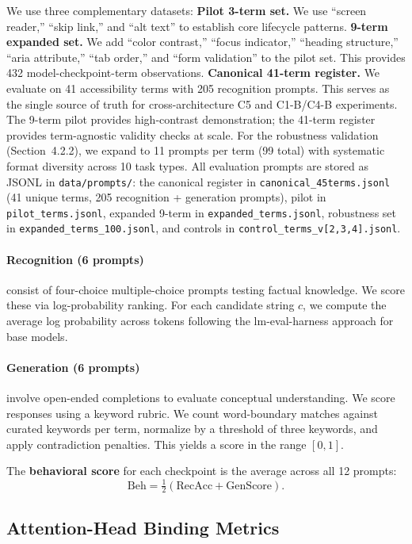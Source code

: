 \documentclass[10pt]{article} %
\begin{document}
We use three complementary datasets:
\textbf{Pilot 3-term set.} We use ``screen reader,'' ``skip link,'' and ``alt text'' to establish core lifecycle patterns.
\textbf{9-term expanded set.} We add ``color contrast,'' ``focus indicator,'' ``heading structure,'' ``aria attribute,'' ``tab order,'' and ``form validation'' to the pilot set. This provides 432 model-checkpoint-term observations.
\textbf{Canonical 41-term register.} We evaluate on 41 accessibility terms with 205 recognition prompts. This serves as the single source of truth for cross-architecture C5 and C1-B/C4-B experiments.
The 9-term pilot provides high-contrast demonstration; the 41-term register provides term-agnostic validity checks at scale.
For the robustness validation (Section~4.2.2), we expand to 11 prompts per term (99 total) with systematic format diversity across 10 task types.
All evaluation prompts are stored as JSONL in \texttt{data/prompts/}: the canonical register in \texttt{canonical\_45terms.jsonl} (41 unique terms, 205 recognition + generation prompts), pilot in \texttt{pilot\_terms.jsonl}, expanded 9-term in \texttt{expanded\_terms.jsonl}, robustness set in \texttt{expanded\_terms\_100.jsonl}, and controls in \texttt{control\_terms\_v{[2,3,4]}.jsonl}.

\paragraph{Recognition (6 prompts)} consist of four-choice multiple-choice prompts testing factual knowledge.
We score these via log-probability ranking. For each candidate string $c$, we compute the average log probability across tokens following the lm-eval-harness approach \citep{gao2021lmharness} for base models.

\paragraph{Generation (6 prompts)} involve open-ended completions to evaluate conceptual understanding.
We score responses using a keyword rubric. We count word-boundary matches against curated keywords per term, normalize by a threshold of three keywords, and apply contradiction penalties. This yields a score in the range $[0,1]$.

The \textbf{behavioral score} for each checkpoint is the average across all 12 prompts:
\[
\mathrm{Beh}=\tfrac{1}{2}(\mathrm{RecAcc}+\mathrm{GenScore}).
\]

\subsection{Attention-Head Binding Metrics}
\end{document}
